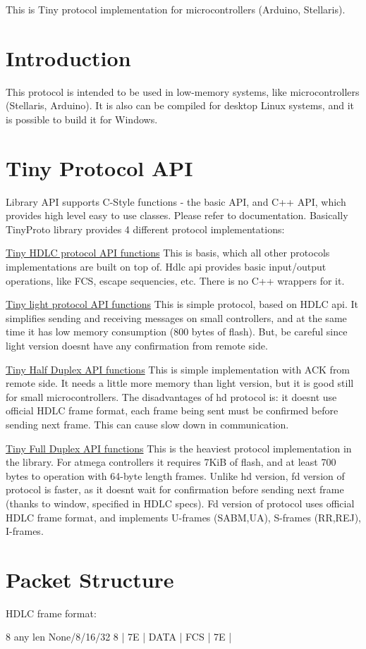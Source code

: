 This is Tiny protocol implementation for microcontrollers (Arduino, Stellaris).\hypertarget{index_introduction}{}\section{Introduction}\label{index_introduction}
This protocol is intended to be used in low-\/memory systems, like microcontrollers (Stellaris, Arduino). It is also can be compiled for desktop Linux systems, and it is possible to build it for Windows.\hypertarget{index_api}{}\section{Tiny Protocol A\+PI}\label{index_api}
Library A\+PI supports C-\/\+Style functions -\/ the basic A\+PI, and C++ A\+PI, which provides high level easy to use classes. Please refer to documentation. Basically Tiny\+Proto library provides 4 different protocol implementations\+:

\hyperlink{group__HDLC__API}{Tiny H\+D\+LC protocol A\+PI functions} This is basis, which all other protocols implementations are built on top of. Hdlc api provides basic input/output operations, like F\+CS, escape sequencies, etc. There is no C++ wrappers for it.

\hyperlink{group__LIGHT__API}{Tiny light protocol A\+PI functions} This is simple protocol, based on H\+D\+LC api. It simplifies sending and receiving messages on small controllers, and at the same time it has low memory consumption (800 bytes of flash). But, be careful since light version doesn\textquotesingle{}t have any confirmation from remote side.

\hyperlink{group__HALF__DUPLEX__API}{Tiny Half Duplex A\+PI functions} This is simple implementation with A\+CK from remote side. It needs a little more memory than light version, but it is good still for small microcontrollers. The disadvantages of hd protocol is\+: it doesn\textquotesingle{}t use official H\+D\+LC frame format, each frame being sent must be confirmed before sending next frame. This can cause slow down in communication.

\hyperlink{group__FULL__DUPLEX__API}{Tiny Full Duplex A\+PI functions} This is the heaviest protocol implementation in the library. For atmega controllers it requires 7\+KiB of flash, and at least 700 bytes to operation with 64-\/byte length frames. Unlike hd version, fd version of protocol is faster, as it doesn\textquotesingle{}t wait for confirmation before sending next frame (thanks to window, specified in H\+D\+LC specs). Fd version of protocol uses official H\+D\+LC frame format, and implements U-\/frames (S\+A\+BM,UA), S-\/frames (RR,R\+EJ), I-\/frames.\hypertarget{index_packet}{}\section{Packet Structure}\label{index_packet}
H\+D\+LC frame format\+: 
\begin{DoxyPre}
     8        any len    None/8/16/32     8
 |   7E   |    DATA     |    FCS     |   7E   |
\end{DoxyPre}


